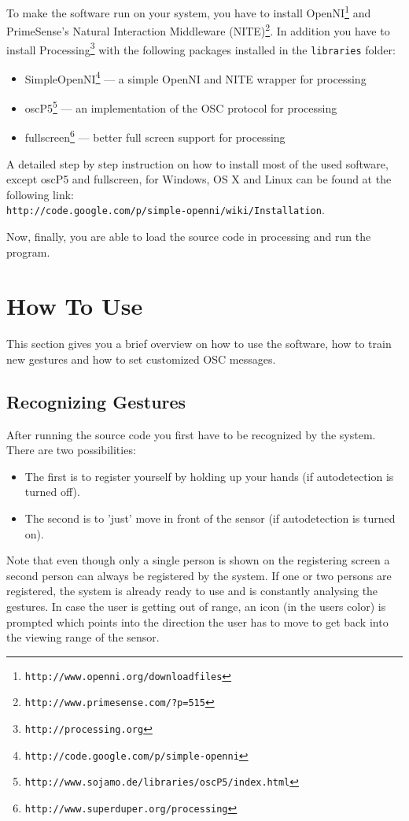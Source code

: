 \documentclass[titlepage,12pt,a4paper]{article}
\begin{document}
To make the software run on your system, you have to install OpenNI\footnote{\texttt{http://www.openni.org/downloadfiles}} and PrimeSense's Natural Interaction Middleware (NITE)\footnote{\texttt{http://www.primesense.com/?p=515}}. In addition you have to install Processing\footnote{\texttt{http://processing.org}} with the following packages installed in the \texttt{libraries} folder:
\begin{itemize}
	\item SimpleOpenNI\footnote{\texttt{http://code.google.com/p/simple-openni}} --- a simple OpenNI and NITE wrapper for processing
	\item oscP5\footnote{\texttt{http://www.sojamo.de/libraries/oscP5/index.html}} --- an implementation of the OSC protocol for processing
	\item fullscreen\footnote{\texttt{http://www.superduper.org/processing}} --- better full screen support for processing
\end{itemize}

A detailed step by step instruction on how to install most of the used software, except oscP5 and fullscreen, for Windows, OS X and Linux can be found at the following link:\\ \texttt{http://code.google.com/p/simple-openni/wiki/Installation}.

Now, finally, you are able to load the source code in processing and run the program.

\newpage

 \section{How To Use}

This section gives you a brief overview on how to use the software, how to train new gestures and how to set customized OSC messages.

 \subsection{Recognizing Gestures}

After running the source code you first have to be recognized by the system. There are two possibilities:
\begin{itemize}
	\item The first is to register yourself by holding up your hands (if autodetection is turned off). 
	\item The second is to 'just' move in front of the sensor (if autodetection is turned on).
\end{itemize}
Note that even though only a single person is shown on the registering screen a second person can always be registered by the system. If one or two persons are registered, the system is already ready to use and is constantly analysing the gestures. In case the user is getting out of range, an icon (in the users color) is prompted which points into the direction the user has to move to get back into the viewing range of the sensor.
\end{document}
